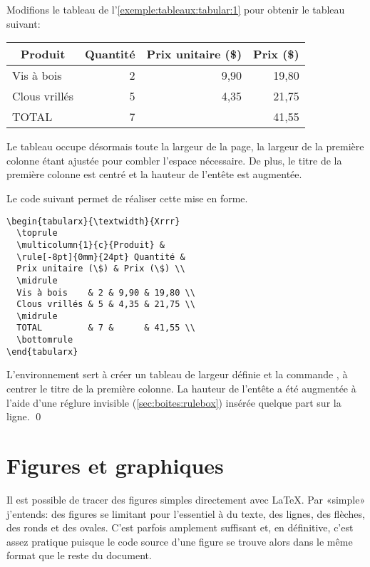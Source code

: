 \begin{exemple}
  \label{exemple:tableaux:tabular:2}
  Modifions le tableau de l'\autoref{exemple:tableaux:tabular:1} pour
  obtenir le tableau suivant:
  \begin{center}
    \begin{tabularx}{\textwidth}{Xrrr}
      \toprule
      \multicolumn{1}{c}{Produit} &
      \rule[-8pt]{0mm}{24pt} Quantité & Prix unitaire (\$) & Prix (\$) \\
      \midrule
      Vis à bois    & 2 & 9,90 & 19,80 \\
      Clous vrillés & 5 & 4,35 & 21,75 \\
      \midrule
      TOTAL         & 7 &      & 41,55 \\
      \bottomrule
    \end{tabularx}
  \end{center}
  Le tableau occupe désormais toute la largeur de la page, la largeur
  de la première colonne étant ajustée pour combler l'espace
  nécessaire. De plus, le titre de la première colonne est centré et
  la hauteur de l'entête est augmentée.

  Le code suivant permet de réaliser cette mise en forme.
\begin{lstlisting}
\begin{tabularx}{\textwidth}{Xrrr}
  \toprule
  \multicolumn{1}{c}{Produit} &
  \rule[-8pt]{0mm}{24pt} Quantité &
  Prix unitaire (\$) & Prix (\$) \\
  \midrule
  Vis à bois    & 2 & 9,90 & 19,80 \\
  Clous vrillés & 5 & 4,35 & 21,75 \\
  \midrule
  TOTAL         & 7 &      & 41,55 \\
  \bottomrule
\end{tabularx}
\end{lstlisting}
  L'environnement  sert à créer un tableau de largeur
  définie et la commande \cmd{\multicolumn}, à centrer le titre de la
  première colonne. La hauteur de l'entête a été augmentée à l'aide
  d'une réglure invisible (\autoref{sec:boites:rulebox}) insérée
  quelque part sur la ligne. %
  \qed
\end{exemple}


\section{Figures et graphiques}
\label{sec:tableaux:figures}

Il est possible de tracer des figures simples directement avec
{\LaTeX}. Par «simple» j'entends: des figures se limitant pour
l'essentiel à du texte, des lignes, des flèches, des ronds et des
ovales. C'est parfois amplement suffisant et, en définitive, c'est assez
pratique puisque le code source d'une figure se trouve alors dans le
même format que le reste du document.

